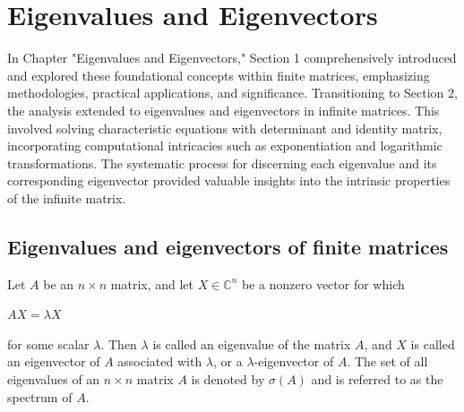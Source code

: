 \chapter{Eigenvalues and Eigenvectors}
In Chapter "Eigenvalues and Eigenvectors," Section 1 comprehensively introduced and explored these foundational concepts within finite matrices, emphasizing methodologies, practical applications, and significance. Transitioning to Section 2, the analysis extended to eigenvalues and eigenvectors in infinite matrices. This involved solving characteristic equations with determinant and identity matrix, incorporating computational intricacies such as exponentiation and logarithmic transformations. The systematic process for discerning each eigenvalue and its corresponding eigenvector provided valuable insights into the intrinsic properties of the infinite matrix.
\section{Eigenvalues and eigenvectors of finite matrices}\label{sec:intro_eigen}
\begin{definition}
Let $ A $ be an $ n \times n $ matrix, and let $ {X} \in \mathbb{C}^n $ be a nonzero vector for which
\begin{center}
    $A{X} = \lambda {X} $
\end{center}
for some scalar $ \lambda $. Then $ \lambda $ is called an eigenvalue of the matrix $ A $, and $ {X} $ is called an eigenvector of $ A $ associated with $ \lambda $, or a $ \lambda $-eigenvector of $ A $.\newline
The set of all eigenvalues of an $ n \times n $ matrix $ A $ is denoted by $ \sigma(A) $ and is referred to as the spectrum of $ A $.\cite{gilbertstrang}    
\end{definition}

